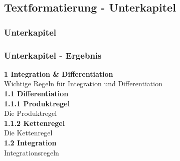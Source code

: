 \documentclass{beamer}
\begin{document}
\subsection{Textformatierung - Unterkapitel}
\begin{frame}[fragile]
\frametitle{Unterkapitel}
\begin{semiverbatim}
\end{semiverbatim}
\end{frame}

\begin{frame}
\frametitle{Unterkapitel - Ergebnis}
  \Large \textbf{1 Integration \& Differentiation} \\
  \vspace{1ex}
  \normalsize Wichtige Regeln für Integration und Differentiation\\
  \vspace{2ex}
  \large \textbf{1.1 Differentiation} \\
  \vspace{1ex}
  \normalsize \textbf{1.1.1 Produktregel} \\
  Die Produktregel\\
  \vspace{2ex}
  \textbf{1.1.2 Kettenregel} \\
  Die Kettenregel \\
  \vspace{2ex}
  \large \textbf{1.2 Integration}\\
  \vspace{1ex}
  \normalsize Integrationsregeln
\end{frame}
\end{document}
